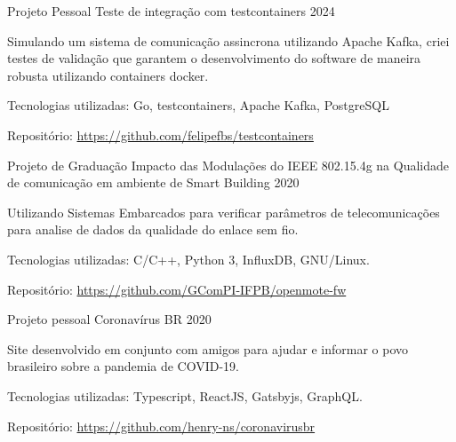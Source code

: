
\begin{cventries}
  \cventry
  {Projeto Pessoal} %
  {Teste de integração com testcontainers} %
  {} %
  {2024} %
  {
    \begin{cvitems} %
      \item {Simulando um sistema de comunicação assincrona utilizando Apache Kafka, criei testes de validação que garantem o desenvolvimento do software de maneira robusta utilizando containers docker.}
      \item {Tecnologias utilizadas: Go, testcontainers, Apache Kafka, PostgreSQL}
      \item {Repositório: \url{https://github.com/felipefbs/testcontainers}}
    \end{cvitems}
  }

  \cventry
  {Projeto de Graduação} %
  {Impacto das Modulações do IEEE 802.15.4g na Qualidade de comunicação em ambiente de Smart Building} %
  {} %
  {2020} %
  {
    \begin{cvitems} %
      \item {Utilizando Sistemas Embarcados para verificar parâmetros de telecomunicações para analise de dados da qualidade do enlace sem fio.}
      \item {Tecnologias utilizadas: C/C++, Python 3, InfluxDB, GNU/Linux.}
      \item {Repositório: \url{https://github.com/GComPI-IFPB/openmote-fw}}
    \end{cvitems}
  }


  \cventry
  {Projeto pessoal} %
  {Coronavírus BR} %
  {} %
  {2020} %
  {
    \begin{cvitems} %
      \item {Site desenvolvido em conjunto com amigos para ajudar e informar o povo brasileiro sobre a pandemia de COVID-19.}
      \item {Tecnologias utilizadas: Typescript, ReactJS, Gatsbyjs, GraphQL.}
      \item {Repositório: \url{https://github.com/henry-ns/coronavirusbr}}
    \end{cvitems}
  }


\end{cventries}
